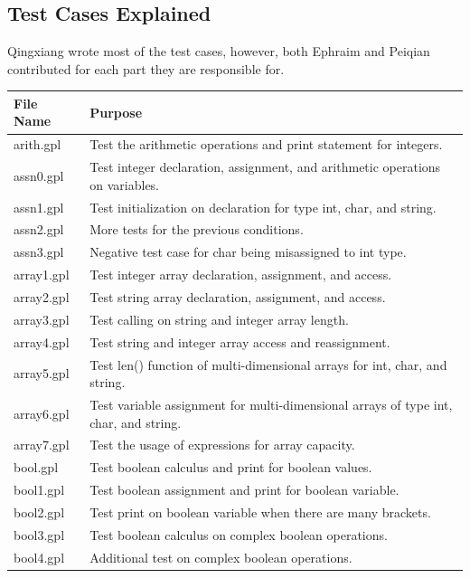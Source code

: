 \documentclass[a4paper,12pt]{article}
\begin{document}
\subsection{Test Cases Explained}
Qingxiang wrote most of the test cases, however, both Ephraim and Peiqian contributed for each part they are responsible for.
\begin{center}
    \begin{longtable}{ | p{3cm} | p{10cm} |}
    \hline File Name & Purpose \\ \hline \endhead 
    arith.gpl & Test the arithmetic operations and print statement for integers.\\ \hline
    assn0.gpl & Test integer declaration, assignment, and arithmetic operations on variables. \\ \hline
    assn1.gpl & Test initialization on declaration for type int, char, and string. \\ \hline
    assn2.gpl & More tests for the previous conditions. \\ \hline
    assn3.gpl & Negative test case for char being misassigned to int type. \\ \hline
    array1.gpl & Test integer array declaration, assignment, and access.  \\ \hline
    array2.gpl & Test string array declaration, assignment, and access.  \\ \hline
    array3.gpl & Test calling on string and integer array length.  \\ \hline
    array4.gpl & Test string and integer array access and reassignment.  \\ \hline
    array5.gpl & Test len() function of multi-dimensional arrays for int, char, and string.  \\ \hline
    array6.gpl & Test variable assignment for multi-dimensional arrays of type int, char, and string.  \\ \hline
    array7.gpl & Test the usage of expressions for array capacity.  \\ \hline
    bool.gpl & Test boolean calculus and print for boolean values. \\ \hline
    bool1.gpl & Test boolean assignment and print for boolean variable. \\ \hline
    bool2.gpl & Test print on boolean variable when there are many brackets. \\ \hline
    bool3.gpl & Test boolean calculus on complex boolean operations. \\ \hline
    bool4.gpl & Additional test on complex boolean operations. \\ \hline

\end{longtable}
\end{center}
\end{document}
